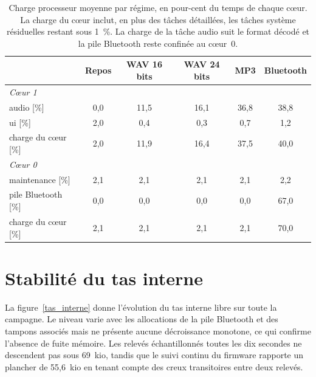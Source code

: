 \begin{table}[H]
    \centering
    \caption{Charge processeur moyenne par régime, en pour-cent du temps de chaque cœur. La charge du cœur inclut, en plus des tâches détaillées, les tâches système résiduelles restant sous 1~\%. La charge de la tâche audio suit le format décodé et la pile Bluetooth reste confinée au cœur~0.}
    \label{tab:charge_regime}
    \begin{tabular}{lccccc}
        \toprule
                                  & Repos & WAV 16 bits & WAV 24 bits & MP3  & Bluetooth \\
        \midrule
        \multicolumn{6}{l}{\textit{Cœur 1}}                                              \\
        \quad audio [\%]          & 0,0   & 11,5        & 16,1        & 36,8 & 38,8      \\
        \quad ui [\%]             & 2,0   & 0,4         & 0,3         & 0,7  & 1,2       \\
        \quad charge du cœur [\%] & 2,0   & 11,9        & 16,4        & 37,5 & 40,0      \\
        \midrule
        \multicolumn{6}{l}{\textit{Cœur 0}}                                              \\
        \quad maintenance [\%]    & 2,1   & 2,1         & 2,1         & 2,1  & 2,2       \\
        \quad pile Bluetooth [\%] & 0,0   & 0,0         & 0,0         & 0,0  & 67,0      \\
        \quad charge du cœur [\%] & 2,1   & 2,1         & 2,1         & 2,1  & 70,0      \\
        \bottomrule
    \end{tabular}
\end{table}


\section*{Stabilité du tas interne}

La figure~\ref{tas_interne} donne l'évolution du tas interne libre sur toute la campagne. Le niveau varie avec les allocations de la pile Bluetooth et des tampons associés mais ne présente aucune décroissance monotone, ce qui confirme l'absence de fuite mémoire. Les relevés échantillonnés toutes les dix secondes ne descendent pas sous 69~kio, tandis que le suivi continu du firmware rapporte un plancher de 55,6~kio en tenant compte des creux transitoires entre deux relevés.

